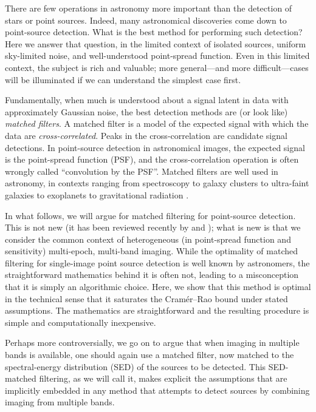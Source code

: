 \documentclass[11pt,letterpaper,linenumbers]{aastex7}
\newcommand{\changed}[1]{#1}
\begin{document}
There are few operations in astronomy more important than the
detection of stars or point sources.
Indeed, many astronomical discoveries come down to point-source
detection.
What is the best method for performing such detection?
Here we answer that question, in the limited context of isolated
sources, uniform sky-limited noise, and well-understood point-spread
function.
Even in this limited context, the subject is rich and valuable; more
general---and more difficult---cases will be illuminated if we can
understand the simplest case first.


Fundamentally, when much is understood about a \changed{signal latent in
data with approximately Gaussian noise}, the best detection methods are (or look like) \emph{matched
filters}.
A matched filter is a model of the expected signal with which the data
are \emph{cross-correlated}. %
Peaks in the cross-correlation are candidate signal detections.
In point-source detection in astronomical images, the expected signal is the
point-spread function (PSF), and the cross-correlation operation is often
wrongly called ``convolution by the PSF''.
Matched filters are well used in astronomy, in contexts ranging from
spectroscopy \citep{bossspectro} to
galaxy clusters \citep{redmapper, melin} to
ultra-faint galaxies \citep{willman1} to
exoplanets \citep{exoplanet} to
gravitational radiation \citep{ligo}.


In what follows, we will argue for matched filtering for point-source
detection.  This is not new (it has been reviewed recently by
\citealt{zackay1} and \citealt{zackay2}); what is new is that we consider the common context of
heterogeneous (in point-spread function and sensitivity) multi-epoch,
multi-band imaging.
%
While the optimality of matched filtering for single-image point
source detection is well known by astronomers, the straightforward
mathematics behind it is often not, leading to a misconception that it
is simply an algorithmic choice.  Here, we show that this method is
optimal in the technical sense that it saturates the Cram\'er--Rao
bound under stated assumptions.  The mathematics are straightforward
and the resulting procedure is simple and computationally inexpensive.

Perhaps more controversially, we go on to argue that when imaging in
multiple bands is available, one should again use a matched filter,
now matched to the spectral-energy distribution (SED) of the sources
to be detected.  This SED-matched filtering, as we will call it, makes
explicit the assumptions that are implicitly embedded in any method
that attempts to detect sources by combining imaging from multiple
bands.
\end{document}
